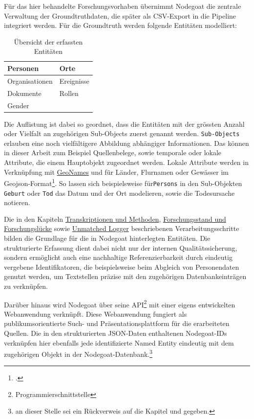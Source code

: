 \documentclass[12pt, a4paper, ngerman, bidi=default]{article}
\let\cite\footcite
\newcommand{\code}[1]{\colorbox{VeryLightGray}{\texttt{#1}}} %
\begin{document}
Für das hier behandelte Forschungsvorhaben übernimmt Nodegoat die zentrale Verwaltung der Groundtruthdaten, die später als CSV-Export in die Pipeline integriert werden. 
Für die Groundtruth werden folgende Entitäten modelliert:

\begin{table}[h]
  \renewcommand{\arraystretch}{1.5}
  \centering
  \begin{tabular}{|p{}|p{}|}
    \hline
    Personen & Orte \\ \hline
    Organisationen & Ereignisse \\ \hline
    Dokumente & Rollen \\ \hline
    Gender & \\ \hline
  \end{tabular}
  \caption{\small Übersicht der erfassten Entitäten}
\end{table}

Die Auflistung ist dabei so geordnet, dass die Entitäten mit der grössten Anzahl oder Vielfalt an zugehörigen Sub-Objects zuerst genannt werden. \code{Sub-Objects} erlauben eine
noch vielfältigere Abbildung abhängiger Informationen. Das können in dieser Arbeit zum Beispiel Quellenbelege, sowie temporale oder lokale Attribute, die einem Hauptobjekt zugeordnet werden. Lokale Attribute 
werden in Verknüpfung mit \hyperref[subsec:geonames]{GeoNames} und für Länder, Flurnamen oder Gewässer im Geojson-Format\cite[Weiterführend:][]{thomson_geographic_2017}. So lassen sich beispielsweise für\code{Persons}
in den Sub-Objekten \code{Geburt} oder \code{Tod} das Datum und der Ort modelieren, sowie die Todesursache notieren.

Die in den Kapiteln \hyperref[section:Transkriptionen_Methoden]{Transkriptionen und Methoden}, \hyperref[subsec:forschungsstand]{Forschungsstand und Forschungslücke} 
sowie \hyperref[subsec:unmatched_logger]{Unmatched Logger} beschriebenen Verarbeitungsschritte bilden die Grundlage für die in Nodegoat hinterlegten Entitäten.
Die strukturierte Erfassung dient dabei nicht nur der internen Qualitätssicherung, sondern ermöglicht auch eine nachhaltige Referenzierbarkeit durch eindeutig 
vergebene Identifikatoren, die beispielsweise beim Abgleich von Personendaten genutzt werden, um Textstellen präzise mit den zugehörigen Datenbankeinträgen zu verknüpfen.

Darüber hinaus wird Nodegoat über seine API\footnote{Programmierschnittstelle} mit einer eigens entwickelten Webanwendung verknüpft. Diese Webanwendung fungiert als publikumsorientierte 
Such- und Präsentationsplattform für die erarbeiteten Quellen. Die in den strukturierten JSON-Daten enthaltenen Nodegoat-IDs verknüpfen hier ebenfalls jede identifizierte Named Entity eindeutig mit dem 
zugehörigen Objekt in der Nodegoat-Datenbank.\footnote{an dieser Stelle sei ein Rückverweis auf die Kapitel  und  gegeben.} 
\end{document}
